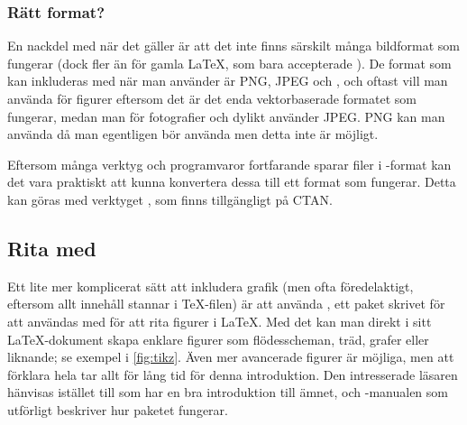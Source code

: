 \documentclass[lang=sv,ptsize=10pt,font=none,nomath,titles=bf,../../a4.tex]{subfiles}
\begin{document}
\subsubsection{Rätt format?}
En nackdel med \pdfLaTeX{} när det gäller  är att det inte
finns särskilt många bildformat som fungerar (dock fler än för gamla
\LaTeX{}, som bara accepterade \EPS). De format som kan inkluderas
med  när man använder \pdfLaTeX{} är \textsc{PNG},
\textsc{JPEG} och \PDF, och oftast vill man använda \PDF{} för figurer
eftersom
det är det enda vektorbaserade formatet som fungerar, medan man för
fotografier och dylikt använder \textsc{JPEG}. \textsc{PNG} kan man
använda då man egentligen bör använda \PDF{} men detta inte är möjligt.

Eftersom många verktyg och programvaror fortfarande sparar filer i
\EPS-format kan det vara praktiskt att kunna konvertera dessa till ett
format som fungerar. Detta kan göras med verktyget , som
finns tillgängligt på CTAN.

\subsection{Rita med \PGFTikZ}
Ett lite mer komplicerat sätt att inkludera grafik (men ofta 
föredelaktigt, eftersom allt innehåll stannar i \TeX-filen) är att använda
\PGFTikZ, ett paket skrivet för att användas med \pdfLaTeX{} för att rita
figurer i \LaTeX{}. Med det kan man direkt i sitt \LaTeX-dokument skapa
enklare figurer som flödesscheman, träd, grafer eller liknande; se exempel
i \cref{fig:tikz}. Även mer avancerade figurer är möjliga, men att
förklara hela \PGFTikZ{} tar allt för lång tid för denna introduktion. Den
intresserade läsaren hänvisas istället till \textcite{Mertz07} som har
en bra introduktion till ämnet, och \PGFTikZ-manualen \parencite{Tantau10} som
utförligt beskriver hur paketet fungerar.
\end{document}
